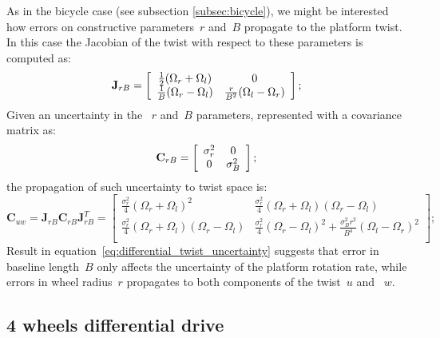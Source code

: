 As in the bicycle case (see subsection \ref{subsec:bicycle}), we might be interested how errors on constructive parameters~$r$ and~$B$ propagate to the platform twist. In this case the Jacobian of the twist with respect to these parameters is computed as: 
\begin{equation}
\mathbf{J}_{r B} = 
\left[
 \begin{array}{cc}
  \frac{1}{2}(\Omega_r+\Omega_l) & 0  \\
  \frac{1}{B}(\Omega_r-\Omega_l) & \frac{r}{B^2}(\Omega_l-\Omega_r)  \\
 \end{array}
 \right]; \\ 
\end{equation}
Given an uncertainty in the ~$r$ and~$B$ parameters, represented with a covariance matrix as:
\begin{equation}
\mathbf{C}_{r B} = 
\left[
 \begin{array}{cc}
  \sigma^2_r & 0  \\
  0 & \sigma^2_B  \\
 \end{array}
 \right]; \\ 
\end{equation}
the propagation of such uncertainty to twist space is: 
\begin{equation}
\mathbf{C}_{uw} = \mathbf{J}_{r B} \mathbf{C}_{r B} \mathbf{J}_{r B}^T = 
 \left[
 \begin{array}{cc}
 \frac{\sigma^2_r}{4}(\Omega_r+\Omega_l)^2 & \frac{\sigma^2_r}{4}(\Omega_r+\Omega_l)(\Omega_r-\Omega_l) \\
 \frac{\sigma^2_r}{4}(\Omega_r+\Omega_l)(\Omega_r-\Omega_l) & \frac{\sigma^2_r}{4}(\Omega_r-\Omega_l)^2 + \frac{\sigma^2_B r^2}{B^4}(\Omega_l-\Omega_r)^2 \\
 \end{array}
 \right];
 \label{eq:differential_twist_uncertainty}
\end{equation}
Result in equation~\ref{eq:differential_twist_uncertainty} suggests that error in baseline length~$B$ only affects the uncertainty of the platform rotation rate, while errors in wheel radius~$r$ propagates to both components of the twist~$u$ and ~$w$. 


\subsection{4 wheels differential drive}






